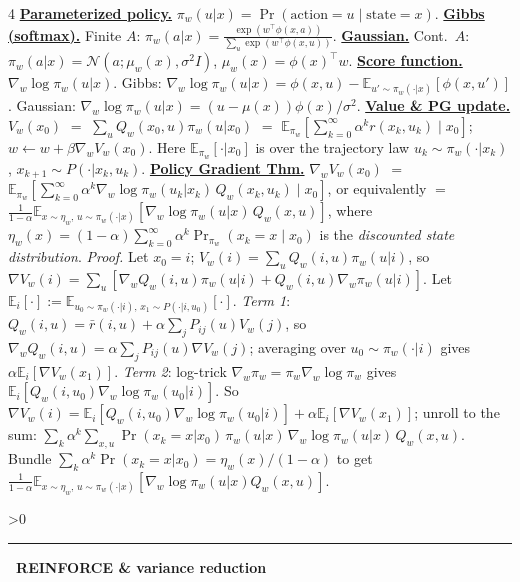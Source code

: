 \documentclass[10pt,landscape,letterpaper]{article}
\let\oldtextbf\textbf
\renewcommand{\textbf}[1]{\uline{\oldtextbf{#1}}}
\renewcommand{\section}[1]{%
  \ifnum\value{section}>0\par\vspace{1pt}\hrule\vspace{1pt}\fi
  \refstepcounter{section}\oldtextbf{\thesection\ #1}\ }
\begin{document}
\begin{multicols*}{4}
\textbf{Parameterized policy.} \(\pi_w(u|x)=\Pr(\text{action}{=}u\!\mid\!\text{state}{=}x)\).
\textbf{Gibbs (softmax).} Finite \(A\): \(\pi_w(a|x)=\frac{\exp(w^\top\phi(x,a))}{\sum_u\exp(w^\top\phi(x,u))}\).
\textbf{Gaussian.} Cont.\ \(A\): \(\pi_w(a|x)=\mathcal N(a;\mu_w(x),\sigma^2 I)\), \(\mu_w(x)=\phi(x)^\top w\).
\textbf{Score function.} \(\nabla_w\log\pi_w(u|x)\).
Gibbs: \(\nabla_w\log\pi_w(u|x)=\phi(x,u)-\mathbb E_{u'\sim\pi_w(\cdot|x)}[\phi(x,u')]\).
Gaussian: \(\nabla_w\log\pi_w(u|x)=(u-\mu(x))\phi(x)/\sigma^2\).
\textbf{Value \& PG update.} \(V_w(x_0)\) \(=\) \(\sum_u Q_w(x_0,u)\pi_w(u|x_0)\) \(=\) \(\mathbb E_{\pi_w}\!\left[\sum_{k=0}^\infty\alpha^k r(x_k,u_k)\!\mid\!x_0\right]\); \(w\leftarrow w+\beta\nabla_w V_w(x_0)\). Here \(\mathbb E_{\pi_w}[\cdot|x_0]\) is over the trajectory law \(u_k\!\sim\!\pi_w(\cdot|x_k)\), \(x_{k+1}\!\sim\!P(\cdot|x_k,u_k)\).
\textbf{Policy Gradient Thm.} \(\nabla_w V_w(x_0)\) \(=\) \(\mathbb E_{\pi_w}\!\left[\sum_{k=0}^\infty\alpha^k\nabla_w\log\pi_w(u_k|x_k)\,Q_w(x_k,u_k)\!\mid\!x_0\right]\), or equivalently \(=\) \(\tfrac{1}{1-\alpha}\mathbb E_{x\sim\eta_w,\,u\sim\pi_w(\cdot|x)}[\nabla_w\log\pi_w(u|x)\,Q_w(x,u)]\), where \(\eta_w(x)=(1-\alpha)\sum_{k=0}^\infty\alpha^k\Pr_{\pi_w}(x_k{=}x\mid x_0)\) is the \emph{discounted state distribution}.
\emph{Proof.} Let \(x_0{=}i\); \(V_w(i)=\sum_u Q_w(i,u)\pi_w(u|i)\), so \(\nabla V_w(i)=\sum_u[\nabla_w Q_w(i,u)\pi_w(u|i)+Q_w(i,u)\nabla_w\pi_w(u|i)]\). Let \(\mathbb E_i[\cdot]{:=}\mathbb E_{u_0\sim\pi_w(\cdot|i),\,x_1\sim P(\cdot|i,u_0)}[\cdot]\).
\emph{Term 1}: \(Q_w(i,u){=}\bar r(i,u)+\alpha\!\sum_j\!P_{ij}(u)V_w(j)\), so \(\nabla_w Q_w(i,u)=\alpha\!\sum_j\!P_{ij}(u)\nabla V_w(j)\); averaging over \(u_0\!\sim\!\pi_w(\cdot|i)\) gives \(\alpha\mathbb E_i[\nabla V_w(x_1)]\).
\emph{Term 2}: log-trick \(\nabla_w\pi_w=\pi_w\nabla_w\log\pi_w\) gives \(\mathbb E_i[Q_w(i,u_0)\nabla_w\log\pi_w(u_0|i)]\). So \(\nabla V_w(i)=\mathbb E_i[Q_w(i,u_0)\nabla_w\log\pi_w(u_0|i)]+\alpha\mathbb E_i[\nabla V_w(x_1)]\); unroll to the sum: \(\sum_k\alpha^k\sum_{x,u}\Pr(x_k{=}x|x_0)\,\pi_w(u|x)\,\nabla_w\log\pi_w(u|x)\,Q_w(x,u)\). Bundle \(\sum_k\alpha^k\Pr(x_k{=}x|x_0)=\eta_w(x)/(1{-}\alpha)\) to get \(\tfrac{1}{1-\alpha}\mathbb E_{x\sim\eta_w,\,u\sim\pi_w(\cdot|x)}[\nabla_w\log\pi_w(u|x)Q_w(x,u)]\).

\section{REINFORCE \& variance reduction}


\end{multicols*}
\end{document}
